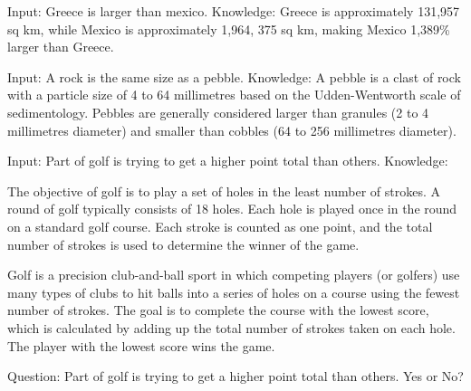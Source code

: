 \begin{flushleft}
  \begin{minipage}[t]{0.49\linewidth}
    \raggedright


    \begin{tcolorbox}

      Input: Greece is larger than mexico.
      Knowledge: Greece is approximately 131,957 sq km, while Mexico is
      approximately 1,964, 375 sq km, making Mexico 1,389\% larger than Greece.

      Input: A rock is the same size as a pebble.
      Knowledge: A pebble is a clast of rock with a particle size of 4 to 64
      millimetres based on the Udden-Wentworth scale of sedimentology. Pebbles
      are generally considered larger than granules (2 to 4 millimetres
      diameter) and smaller than cobbles (64 to 256 millimetres diameter).

      Input: Part of golf is trying to get a higher point total than others.
      Knowledge:
    \end{tcolorbox}


    \begin{tcolorbox}[title=Knowledge 1]
      The objective of golf is to play a set of holes in the least number of strokes. A
      round of golf typically consists of 18 holes. Each hole is played once in the
      round on a standard golf course. Each stroke is counted as one point, and the
      total number of strokes is used to determine the winner of the game.
    \end{tcolorbox}


    \begin{tcolorbox}[title=Knowledge 2]
      Golf is a precision club-and-ball sport in which competing players (or golfers)
      use many types of clubs to hit balls into a series of holes on a course using the
      fewest number of strokes. The goal is to complete the course with the lowest
      score, which is calculated by adding up the total number of strokes taken on each
      hole. The player with the lowest score wins the game.
    \end{tcolorbox}


  \end{minipage}%
  \hfill
  \begin{minipage}[t]{0.49\linewidth}
    \raggedright
    \begin{tcolorbox}[
        title=High-confidence prediction,
        colframe=green!55!black,    %
        colback=green!5!white       %
      ]
      Question: Part of golf is trying to get a higher point total than others.
      Yes or No?


\end{tcolorbox}
\end{minipage}
\end{flushleft}
